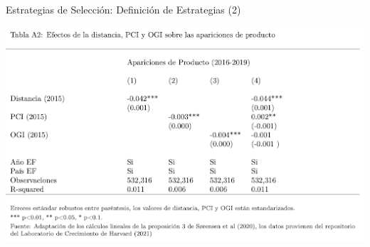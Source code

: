 \documentclass{beamer}
\begin{document}
\begin{frame}{Estrategias de Selección: Definición de Estrategias (2)}
    \begin{center}
        \includegraphics[width=1.0\textwidth]{TablaA2.png}
    \end{center}
    \vspace{-0.25cm}

\end{frame}
\end{document}
